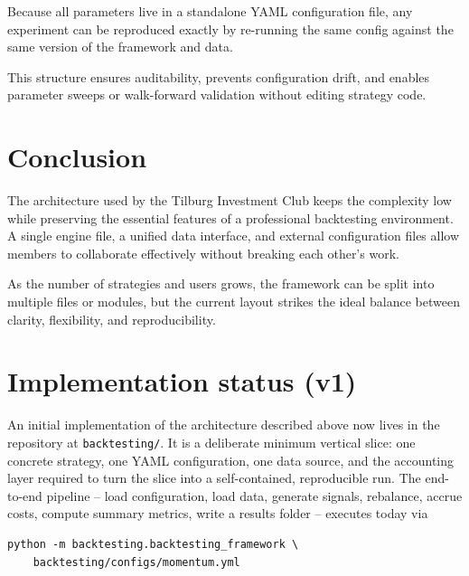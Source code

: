 \documentclass[11pt]{article}
\begin{document}
Because all parameters live in a standalone YAML configuration file, any experiment 
can be reproduced exactly by re-running the same config against the same version of 
the framework and data.

This structure ensures auditability, prevents configuration drift, and enables
parameter sweeps or walk-forward validation without editing strategy code.

\section{Conclusion}
The architecture used by the Tilburg Investment Club keeps the 
complexity low while preserving the essential features of a professional backtesting 
environment. A single engine file, a unified data interface, and external configuration 
files allow members to collaborate effectively without breaking each other's work.

As the number of strategies and users grows, the framework can be split into multiple 
files or modules, but the current layout strikes the ideal balance between clarity, 
flexibility, and reproducibility.

\section{Implementation status (v1)}

An initial implementation of the architecture described above now lives
in the repository at \texttt{backtesting/}. It is a deliberate minimum
vertical slice: one concrete strategy, one YAML configuration, one data
source, and the accounting layer required to turn the slice into a
self-contained, reproducible run. The end-to-end pipeline -- load
configuration, load data, generate signals, rebalance, accrue costs,
compute summary metrics, write a results folder -- executes today via

\begin{verbatim}
python -m backtesting.backtesting_framework \
    backtesting/configs/momentum.yml
\end{verbatim}
\end{document}
